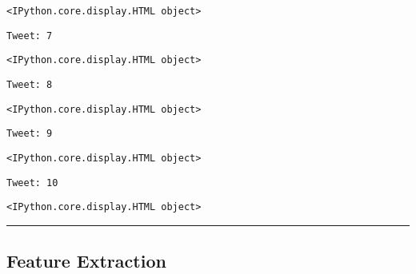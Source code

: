     
    \begin{Verbatim}[commandchars=\\\{\}]
<IPython.core.display.HTML object>
    \end{Verbatim}

    
    \begin{Verbatim}[commandchars=\\\{\}]
Tweet: 7
    \end{Verbatim}

    
    \begin{Verbatim}[commandchars=\\\{\}]
<IPython.core.display.HTML object>
    \end{Verbatim}

    
    \begin{Verbatim}[commandchars=\\\{\}]
Tweet: 8
    \end{Verbatim}

    
    \begin{Verbatim}[commandchars=\\\{\}]
<IPython.core.display.HTML object>
    \end{Verbatim}

    
    \begin{Verbatim}[commandchars=\\\{\}]
Tweet: 9
    \end{Verbatim}

    
    \begin{Verbatim}[commandchars=\\\{\}]
<IPython.core.display.HTML object>
    \end{Verbatim}

    
    \begin{Verbatim}[commandchars=\\\{\}]
Tweet: 10
    \end{Verbatim}

    
    \begin{Verbatim}[commandchars=\\\{\}]
<IPython.core.display.HTML object>
    \end{Verbatim}

    
    \begin{center}\rule{0.5\linewidth}{0.5pt}\end{center}

    \hypertarget{feature-extraction}{%
\subsection{Feature Extraction}\label{feature-extraction}}

